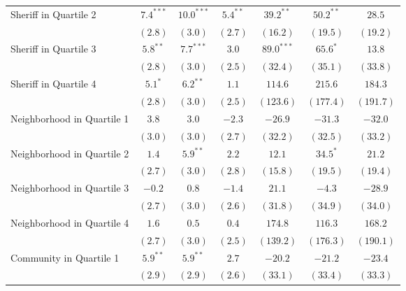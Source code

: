\documentclass[12pt]{article}
\begin{document}
\begin{center}
\begin{longtable}{l c c c c c c }
Sheriff in Quartile 2      & $7.4^{***}$   & $10.0^{***}$  & $5.4^{**}$   & $39.2^{**}$   & $50.2^{**}$    & $28.5$         \\
                           & $(2.8)$       & $(3.0)$       & $(2.7)$      & $(16.2)$      & $(19.5)$       & $(19.2)$       \\
Sheriff in Quartile 3      & $5.8^{**}$    & $7.7^{***}$   & $3.0$        & $89.0^{***}$  & $65.6^{*}$     & $13.8$         \\
                           & $(2.8)$       & $(3.0)$       & $(2.5)$      & $(32.4)$      & $(35.1)$       & $(33.8)$       \\
Sheriff in Quartile 4      & $5.1^{*}$     & $6.2^{**}$    & $1.1$        & $114.6$       & $215.6$        & $184.3$        \\
                           & $(2.8)$       & $(3.0)$       & $(2.5)$      & $(123.6)$     & $(177.4)$      & $(191.7)$      \\
Neighborhood in Quartile 1 & $3.8$         & $3.0$         & $-2.3$       & $-26.9$       & $-31.3$        & $-32.0$        \\
                           & $(3.0)$       & $(3.0)$       & $(2.7)$      & $(32.2)$      & $(32.5)$       & $(33.2)$       \\
Neighborhood in Quartile 2 & $1.4$         & $5.9^{**}$    & $2.2$        & $12.1$        & $34.5^{*}$     & $21.2$         \\
                           & $(2.7)$       & $(3.0)$       & $(2.8)$      & $(15.8)$      & $(19.5)$       & $(19.4)$       \\
Neighborhood in Quartile 3 & $-0.2$        & $0.8$         & $-1.4$       & $21.1$        & $-4.3$         & $-28.9$        \\
                           & $(2.7)$       & $(3.0)$       & $(2.6)$      & $(31.8)$      & $(34.9)$       & $(34.0)$       \\
Neighborhood in Quartile 4 & $1.6$         & $0.5$         & $0.4$        & $174.8$       & $116.3$        & $168.2$        \\
                           & $(2.7)$       & $(3.0)$       & $(2.5)$      & $(139.2)$     & $(176.3)$      & $(190.1)$      \\
Community in Quartile 1    & $5.9^{**}$    & $5.9^{**}$    & $2.7$        & $-20.2$       & $-21.2$        & $-23.4$        \\
                           & $(2.9)$       & $(2.9)$       & $(2.6)$      & $(33.1)$      & $(33.4)$       & $(33.3)$       \\

\end{longtable}
\end{center}
\end{document}
